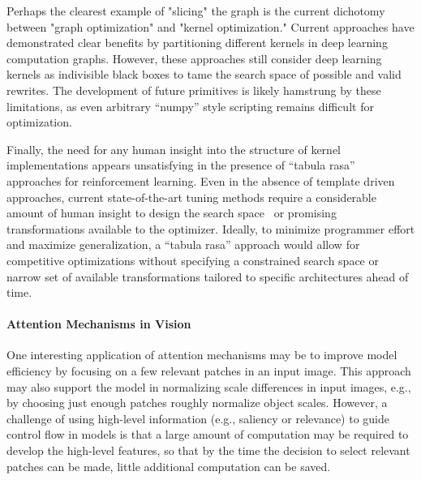 Perhaps the clearest example of "slicing" the graph is the current dichotomy between "graph optimization" and "kernel optimization."
Current approaches have demonstrated clear benefits by partitioning different kernels in deep learning computation graphs.
However, these approaches still consider deep learning kernels as indivisible black boxes to tame the search space of possible and valid rewrites.
The development of future primitives is likely hamstrung by these limitations, as even arbitrary ``numpy'' style scripting remains difficult for optimization.

Finally, the need for any human insight into the structure of kernel implementations appears unsatisfying in the presence of ``tabula rasa''~\cite{silver2017mastering} approaches for reinforcement learning.
Even in the absence of template driven approaches, current state-of-the-art tuning methods require a considerable amount of human insight to design the search space~\cite{zheng2020ansor} or promising transformations available to the optimizer.
Ideally, to minimize programmer effort and maximize generalization, a ``tabula rasa'' approach would allow for competitive optimizations without specifying a constrained search space or narrow set of available transformations tailored to specific architectures ahead of time.

\paragraph{Attention Mechanisms in Vision}
One interesting application of attention mechanisms may be to improve model efficiency by focusing on a few relevant patches in an input image.
This approach may also support the model in normalizing scale differences in input images, e.g., by choosing just enough patches roughly normalize object scales.
However, a challenge of using high-level information (e.g., saliency or relevance) to guide control flow in models is that a large amount of computation may be required to develop the high-level features, so that by the time the decision to select relevant patches can be made, little additional computation can be saved.

